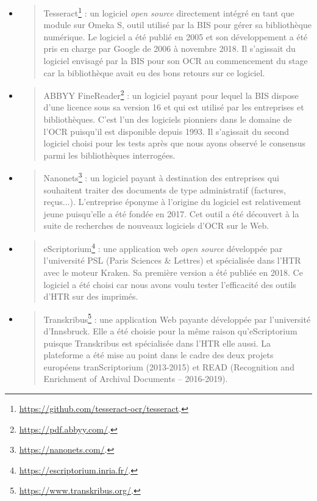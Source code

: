 \documentclass[a4paper,12pt,twoside]{book}
\begin{document}
	\begin{itemize}
		\item
		\begin{quote}
			Tesseract\footnote{\url{https://github.com/tesseract-ocr/tesseract}.}
			: un logiciel \emph{open source} directement intégré en tant que
			module sur Omeka S, outil utilisé par la BIS pour gérer sa
			bibliothèque numérique. Le logiciel a été publié en 2005 et son
			développement a été pris en charge par Google de 2006 à novembre 2018. Il s'agissait du logiciel envisagé par la BIS pour son OCR au commencement du stage car la bibliothèque avait eu des bons retours sur ce logiciel.
		\end{quote}
		\item
		\begin{quote}
			ABBYY FineReader\footnote{\url{https://pdf.abbyy.com/}.}
			: un logiciel payant pour lequel la BIS dispose d'une licence sous sa
			version 16 et qui est utilisé par les entreprises et bibliothèques.
			C'est l'un des logiciels pionniers dans le domaine de l'OCR puisqu'il
			est disponible depuis 1993. Il s'agissait du second logiciel choisi pour les tests après que nous ayons observé le consensus parmi les bibliothèques interrogées.
		\end{quote}
		\item
		\begin{quote}
			Nanonets\footnote{\url{https://nanonets.com/}.}
			: un logiciel payant à destination des entreprises qui souhaitent
			traiter des documents de type administratif (factures, reçus...).
			L'entreprise éponyme à l'origine du logiciel est relativement jeune
			puisqu'elle a été fondée en 2017. Cet outil a été découvert à la suite de recherches de nouveaux logiciels d'OCR sur le Web.
		\end{quote}
		\item
		\begin{quote}
			eScriptorium\footnote{\url{https://escriptorium.inria.fr/}.}
			: une application web \emph{open source} développée par l'université
			PSL (Paris Sciences \& Lettres) et spécialisée dans l'HTR avec le
			moteur Kraken. Sa première version a été publiée en 2018. Ce logiciel a été choisi car nous avons voulu tester l'efficacité des outils d'HTR sur des imprimés.
		\end{quote}
		\item
		\begin{quote}
			Transkribus\footnote{\url{https://www.transkribus.org/}.}
			: une application Web payante développée par l'université d'Innsbruck. Elle a été choisie pour la même raison qu'eScriptorium puisque Transkribus est spécialisée dans l'HTR elle aussi. La plateforme a été mise au
			point dans le cadre des deux projets européens tranScriptorium
			(2013-2015) et READ (Recognition and Enrichment of Archival Documents
			-- 2016-2019). \\
		\end{quote}
	\end{itemize}
	
\end{document}
